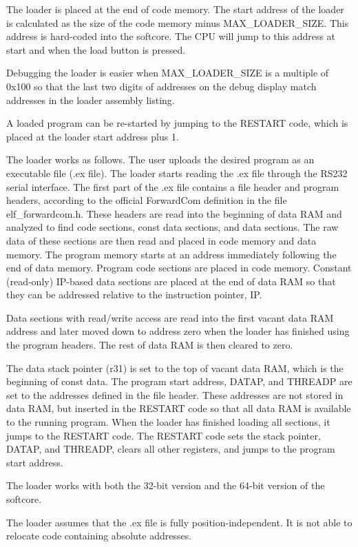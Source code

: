 \documentclass[11pt,a4paper,oneside,openright]{report}
\newcommand{\vv}{ \vspace{2mm} }   %
\begin{document}
The loader is placed at the end of code memory. The start address of the loader is calculated as the size of the code memory minus MAX\_LOADER\_SIZE. This address is hard-coded into the softcore. The CPU will jump to this address at start and when the load button is pressed. 
\vv

Debugging the loader is easier when  MAX\_LOADER\_SIZE is a multiple of 0x100 so that the last two digits of addresses on the debug display match addresses in the loader assembly listing.
\vv

A loaded program can be re-started by jumping to the RESTART code, which is placed at the loader start address plus 1.
\vv

The loader works as follows. The user uploads the desired program as an executable file (.ex file). The loader starts reading the .ex file through the RS232 serial interface. The first part of the .ex file contains a file header and program headers, according to the official ForwardCom definition in the file elf\_forwardcom.h. These headers are read into the beginning of data RAM and analyzed to find code sections, const data sections, and data sections. The raw data of these sections are then read and placed in code memory and data memory. The program memory starts at an address immediately following the end of data memory. Program code sections are placed in code memory. 
Constant (read-only) IP-based data sections are placed at the end of data RAM so that they can be addressed relative to the instruction pointer, IP.
\vv

Data sections with read/write access are read into the first vacant data RAM address and later moved down to address zero when the loader has finished using the program headers. The rest of data RAM is then cleared to zero.
\vv

The data stack pointer (r31) is set to the top of vacant data RAM, which is the beginning of const data. The program start address, DATAP, and THREADP are set to the addresses defined in the file header. These addresses are not stored in data RAM, but inserted in the RESTART code so that all data RAM is available to the running program. When the loader has finished loading all sections, it jumps to the RESTART code. The RESTART code sets the stack pointer, DATAP, and THREADP, clears all other registers, and jumps to the program start address.
\vv

The loader works with both the 32-bit version and the 64-bit version of the softcore.
\vv 

The loader assumes that the .ex file is fully position-independent. It is not able to relocate code containing absolute addresses.
\vv
\end{document}
